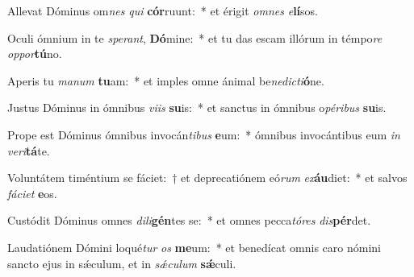 \item Allevat Dóminus om\textit{nes} \textit{qui} \textbf{cór}ruunt:~* et érigit \textit{om}\textit{nes} \textit{e}\textbf{lí}sos.
\item Oculi ómnium in te \textit{spe}\textit{rant}, \textbf{Dó}mine:~* et tu das escam illórum in témpo\textit{re} \textit{op}\textit{por}\textbf{tú}no.
\item Aperis tu \textit{ma}\textit{num} \textbf{tu}am:~* et imples omne ánimal be\textit{ne}\textit{dic}\textit{ti}\textbf{ó}ne.
\item Justus Dóminus in ómnibus \textit{vi}\textit{is} \textbf{su}is:~* et sanctus in ómnibus o\textit{pé}\textit{ri}\textit{bus} \textbf{su}is.
\item Prope est Dóminus ómnibus invocán\textit{ti}\textit{bus} \textbf{e}um:~* ómnibus invocántibus eum \textit{in} \textit{ve}\textit{ri}\textbf{tá}te.
\item Voluntátem timéntium se fáciet:~† et deprecatiónem eó\textit{rum} \textit{ex}\textbf{áu}diet:~* et salvos \textit{fá}\textit{ci}\textit{et} \textbf{e}os.
\item Custódit Dóminus omnes \textit{di}\textit{li}\textbf{gén}tes se:~* et omnes pecca\textit{tó}\textit{res} \textit{dis}\textbf{pér}det.
\item Laudatiónem Dómini loqué\textit{tur} \textit{os} \textbf{me}um:~* et benedícat omnis caro nómini sancto ejus in sǽculum, et in \textit{sǽ}\textit{cu}\textit{lum} \textbf{sǽ}culi.

